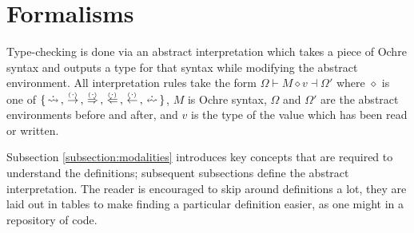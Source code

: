 \documentclass[12pt,twoside]{report}
\begin{document}



\cleardoublepage
\section{Formalisms}
\label{section:abstractinterpretation}
Type-checking is done via an abstract interpretation which takes a piece of Ochre syntax and outputs a type for that syntax while modifying the abstract environment. All interpretation rules take the form $\Omega \vdash M \diamond v \dashv \Omega'$ where $\diamond$ is one of $\{ \allarrows \}$, $M$ is Ochre syntax, $\Omega$ and $\Omega'$ are the abstract environments before and after, and $v$ is the type of the value which has been read or written.

Subsection \ref{subsection:modalities} introduces key concepts that are required to understand the definitions; subsequent subsections define the abstract interpretation. The reader is encouraged to skip around definitions a lot, they are laid out in tables to make finding a particular definition easier, as one might in a repository of code.
\end{document}
